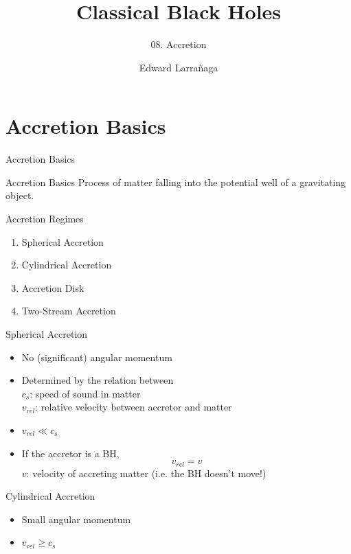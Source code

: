 \documentclass{beamer}
\title{Classical Black Holes} %
\subtitle{08. Accretion} %
\author{Edward Larra\~{n}aga}
\begin{document}
\frame{\maketitle}


\section{Accretion Basics}
\begin{frame}
\Huge
Accretion Basics
\end{frame}

\begin{frame}{Accretion Basics}
	Process of matter falling into the potential well of a gravitating object.\\
\end{frame}

\begin{frame}{Accretion Regimes}
	\begin{enumerate}
	\item Spherical Accretion
	\item Cylindrical Accretion
	\item Accretion Disk
	\item Two-Stream Accretion 
	\end{enumerate}
\end{frame}

\begin{frame}{Spherical Accretion}
	\begin{itemize}
	\item No (significant) angular momentum
	\pause
	\item Determined by the relation between\\
	$c_s$: speed of sound in matter\\
	$v_{rel}$: relative velocity between accretor and matter
	\pause
	\item $v_{rel} \ll c_s$
	\pause	
	\item If the accretor is a BH, 
	$$v_{rel} = v$$
	$v$: velocity of accreting matter (i.e. the BH doesn't move!)  
	\end{itemize}
\end{frame}

\begin{frame}{Cylindrical Accretion}
	\begin{itemize}
	\item Small angular momentum
	\pause
	\item $v_{rel} \geq c_s$
	\end{itemize}
\end{frame}
\end{document}
